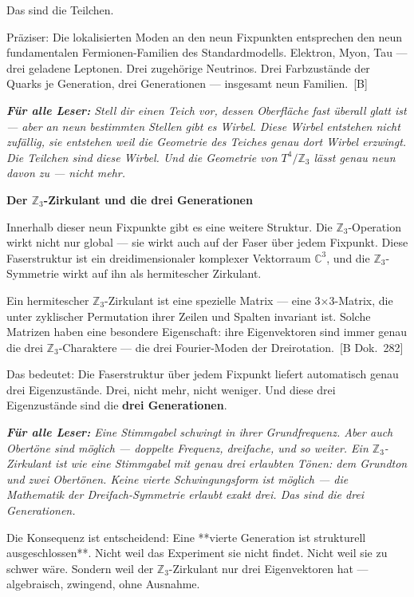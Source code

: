 \documentclass[11pt,oneside]{book}
\newcommand{\status}[1]{\penalty10000\,{\scriptsize\textcolor{gray!60}{[#1]}}}
\newenvironment{laierspur}{%
  \par\vspace{4pt}%
  \noindent\small\itshape\color{blue!60!black}%
  \textbf{Für alle Leser:}\enspace\ignorespaces}{%
  \par\vspace{4pt}\normalsize\normalfont\normalcolor}
\begin{document}
Das sind die Teilchen.


Präziser: Die lokalisierten Moden an den neun Fixpunkten entsprechen den
neun fundamentalen Fermionen-Familien des Standardmodells. Elektron,
Myon, Tau — drei geladene Leptonen. Drei zugehörige Neutrinos. Drei
Farbzustände der Quarks je Generation, drei Generationen — insgesamt
neun Familien. \status{B}


\begin{laierspur}
Stell dir einen Teich vor, dessen Oberfläche fast überall
glatt ist — aber an neun bestimmten Stellen gibt es Wirbel. Diese Wirbel
entstehen nicht zufällig, sie entstehen weil die Geometrie des Teiches
genau dort Wirbel erzwingt. Die Teilchen sind diese Wirbel. Und die
Geometrie von $T^4/\mathbb{Z}_3$ lässt genau neun davon zu — nicht mehr.
\end{laierspur}

\textbf{Der $\mathbb{Z}_3$-Zirkulant und die drei Generationen}


Innerhalb dieser neun Fixpunkte gibt es eine weitere Struktur. Die
$\mathbb{Z}_3$-Operation wirkt nicht nur global — sie wirkt auch auf der Faser über
jedem Fixpunkt. Diese Faserstruktur ist ein dreidimensionaler komplexer
Vektorraum $\mathbb{C}^3$, und die $\mathbb{Z}_3$-Symmetrie wirkt auf ihn als hermitescher
Zirkulant.


Ein hermitescher $\mathbb{Z}_3$-Zirkulant ist eine spezielle Matrix — eine 3$\times$3-Matrix,
die unter zyklischer Permutation ihrer Zeilen und Spalten invariant ist.
Solche Matrizen haben eine besondere Eigenschaft: ihre Eigenvektoren sind
immer genau die drei $\mathbb{Z}_3$-Charaktere — die drei Fourier-Moden der
Dreirotation. \status{B Dok.~282}


Das bedeutet: Die Faserstruktur über jedem Fixpunkt liefert automatisch
genau drei Eigenzustände. Drei, nicht mehr, nicht weniger. Und diese drei
Eigenzustände sind die \textbf{drei Generationen}.


\begin{laierspur}
Eine Stimmgabel schwingt in ihrer Grundfrequenz. Aber auch
Obertöne sind möglich — doppelte Frequenz, dreifache, und so weiter.
Ein $\mathbb{Z}_3$-Zirkulant ist wie eine Stimmgabel mit genau drei erlaubten
Tönen: dem Grundton und zwei Obertönen. Keine vierte Schwingungsform
ist möglich — die Mathematik der Dreifach-Symmetrie erlaubt exakt drei.
Das sind die drei Generationen.
\end{laierspur}

Die Konsequenz ist entscheidend: Eine **vierte Generation ist strukturell
ausgeschlossen**. Nicht weil das Experiment sie nicht findet. Nicht weil
sie zu schwer wäre. Sondern weil der $\mathbb{Z}_3$-Zirkulant nur drei Eigenvektoren
hat — algebraisch, zwingend, ohne Ausnahme.
\end{document}
